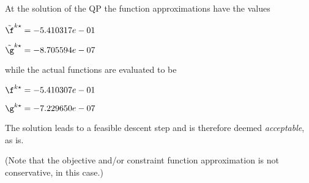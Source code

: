 At the solution of the QP the function approximations have the values

$\tilde \f^{k\star} = -5.410317e-01$

$\tilde \g^{k\star} = -8.705594e-07$

\bigskip
while the actual functions are evaluated to be

$\f^{k\star} = -5.410307e-01$

$\g^{k\star} = -7.229650e-07$

\bigskip
 The solution leads to a feasible descent step and                     is therefore deemed \emph{acceptable}, as is. 
 
(Note that the objective and/or constraint function approximation                         is not conservative, in this case.)
